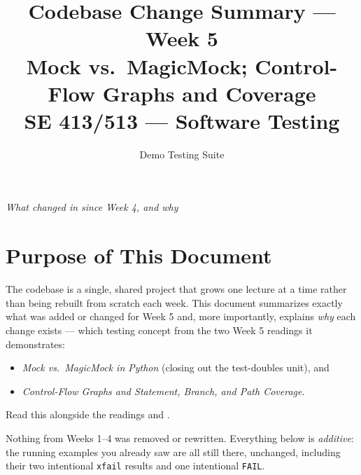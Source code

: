 \documentclass[11pt]{article}
\title{
  \textbf{Codebase Change Summary --- Week 5}\\[4pt]
  \large Mock vs.\ MagicMock; Control-Flow Graphs and Coverage\\[2pt]
  \normalsize SE 413/513 --- Software Testing
}
\author{Demo Testing Suite}
\date{}
\begin{document}
\maketitle

\begin{center}
\textit{What changed in  since Week 4, and why}
\end{center}

\vspace{0.3cm}

\section{Purpose of This Document}
The  codebase is a single, shared project that
grows one lecture at a time rather than being rebuilt from scratch each
week. This document summarizes exactly what was added or changed for
Week 5 and, more importantly, explains \emph{why} each change exists ---
which testing concept from the two Week 5 readings it demonstrates:
\begin{itemize}
\item \textit{Mock vs.\ MagicMock in Python} (closing out the test-doubles unit), and
\item \textit{Control-Flow Graphs and Statement, Branch, and Path Coverage}.
\end{itemize}
Read this alongside the readings and .

\begin{keyidea}
Nothing from Weeks 1--4 was removed or rewritten. Everything below is
\emph{additive}: the running examples you already saw are all still
there, unchanged, including their two intentional \texttt{xfail} results
and one intentional \texttt{FAIL}.
\end{keyidea}

\end{document}
